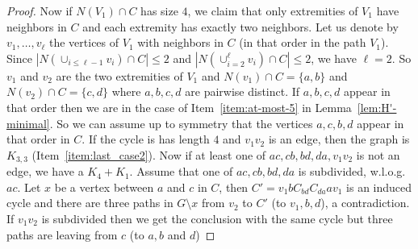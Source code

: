 \documentclass[a4paper,thm-restate,USenglish]{lipics-v2019}
\begin{document}
\begin{proof}
Now if $N(V_1) \cap C$ has size $4$, we claim that only extremities of $V_1$ have neighbors in $C$ and each extremity has exactly two neighbors. Let us denote by $v_1,\ldots,v_\ell$ the vertices of $V_1$ with neighbors in $C$ (in that order in the path $V_1$). Since $|N(\cup_{i \le \ell-1} v_i) \cap C| \le 2$ and $|N(\cup_{i=2}^{\ell} v_i) \cap C| \le 2$, we have $\ell=2$.
So $v_1$ and $v_2$ are the two extremities of $V_1$ and $N(v_1) \cap C = \{a,b\}$ and $N(v_2) \cap C= \{c,d \}$ where $a,b,c,d$ are pairwise distinct. If $a,b,c,d$ appear in that order then we are in the case of Item~\ref{item:at-most-5} in Lemma~\ref{lem:H'-minimal}. So we can assume up to symmetry that the vertices $a,c,b,d$ appear in that order in $C$. If the cycle is has length $4$ and $v_1v_2$ is an edge, then the graph is $K_{3,3}$ (Item~\ref{item:last_case2}). Now if at least one of $ac,cb,bd,da,v_1v_2$ is not an edge, we have a $K_4+K_1$. Assume that one of $ac,cb,bd,da$ is subdivided, w.l.o.g. $ac$. Let $x$ be a vertex between $a$ and $c$ in $C$, then $C'=v_1bC_{bd}C_{da}av_1$ is an induced cycle and there are three paths in $G \setminus x$ from $v_2$ to $C'$ (to $v_1,b,d$), a contradiction. If $v_1v_2$ is subdivided then we get the conclusion with the same cycle but three paths are leaving from $c$ (to $a,b$ and $d$)



\end{proof}
\end{document}
